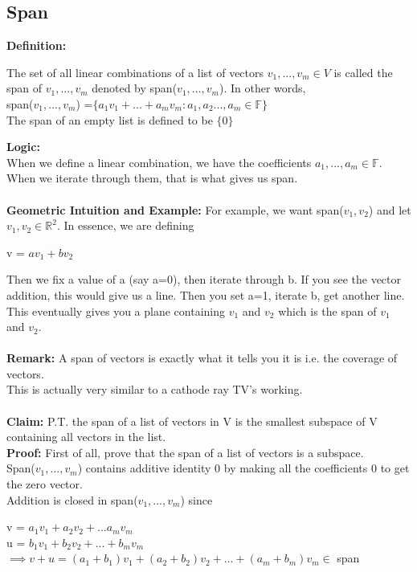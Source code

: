 \documentclass{article}
\begin{document}
\subsection{Span}
\textbf{Definition:} 
\begin{center}
    The set of all linear combinations of a list of vectors $v_1,...,v_m \in V$ is called the span of $v_1,...,v_m$ denoted by span($v_1,...,v_m$). In other words, \\
    span($v_1,...,v_m$) =$\{a_1v_1+...+ a_mv_m: a_1,a_2...,a_m \in \mathbb{F}\}$ \\
    The span of an empty list is defined to be $\{0\}$
\end{center}
\textbf{Logic:} \\
When we define a linear combination, we have the coefficients $a_1,...,a_m \in \mathbb{F}$. When we iterate through them, that is what gives us span. \\
\\
\textbf{Geometric Intuition and Example:} For example, we want span($v_1,v_2$) and let $v_1,v_2 \in \mathbb{R}^2$. In essence, we are defining 
\begin{center}
    v = $av_1+bv_2$
\end{center}
Then we fix a value of a (say a=0), then iterate through b. If you see the vector addition, this would give us a line. Then you set a=1, iterate b, get another line. This eventually gives you a plane containing $v_1$ and $v_2$ which is the span of $v_1$ and $v_2$. \\
\\
\textbf{Remark:} A span of vectors is exactly what it tells you it is i.e. the coverage of vectors. \\
This is actually very similar to a cathode ray TV's working. \\
\\
\textbf{Claim:} P.T. the span of a list of vectors in V is the smallest subspace of V containing all vectors in the list. \\
\textbf{Proof:} First of all, prove that the span of a list of vectors is a subspace. \\
Span($v_1,...,v_m$) contains additive identity 0 by making all the coefficients 0 to get the zero vector. \\
Addition is closed in span($v_1,...,v_m$) since
\begin{center}
    v = $a_1v_1 + a_2v_2+...a_mv_m$ \\
    u = $b_1v_1+b_2v_2+...+b_mv_m$ \\
    $\implies v+u = (a_1+b_1)v_1 + (a_2+b_2)v_2+...+(a_m+b_m)v_m \in$ span
\end{center}
\end{document}
